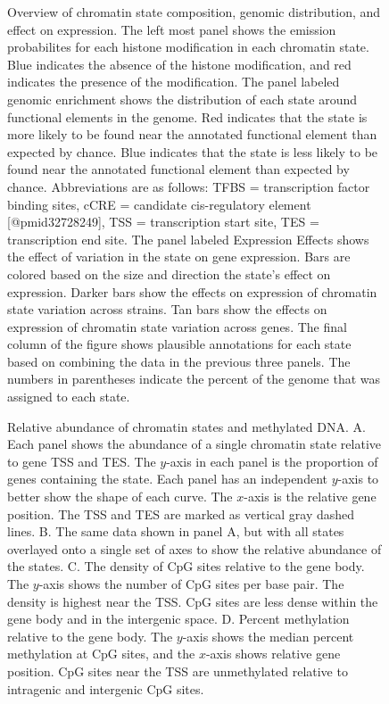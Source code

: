 \documentclass[10pt,letterpaper]{article}
\begin{document}
\begin{figure}[ht]
\centering
\caption{Overview of chromatin state composition, genomic distribution,
and effect on expression. The left most panel shows the emission
probabilites for each histone modification in each chromatin state. 
Blue indicates the absence of the histone modification, and red 
indicates the presence of the modification. The panel labeled
genomic enrichment shows the distribution of each state around 
functional elements in the genome. Red indicates that the
state is more likely to be found near the annotated functional 
element than expected by chance. Blue indicates that the state
is less likely to be found near the annotated functional element
than expected by chance. Abbreviations are as follows: TFBS = 
transcription factor binding sites, cCRE = candidate cis-regulatory
element [@pmid32728249], TSS = transcription start site, 
TES = transcription end site. The panel labeled Expression Effects 
shows the effect of variation in the state on gene expression. 
Bars are colored based on the size and direction the state's effect on
expression. Darker bars show the effects on expression of chromatin 
state variation across strains. Tan bars show the effects on expression
of chromatin state variation across genes. The final column of the figure 
shows plausible annotations for each state based on combining the data in 
the previous three panels. The numbers in parentheses indicate the percent 
of the genome that was assigned to each state.}
\label{fig:state_overview}
\end{figure}

\begin{figure}[ht]
\centering
\caption{Relative abundance of chromatin states and methylated DNA. A. Each panel shows
the abundance of a single chromatin state relative to gene TSS and TES. The 
$y$-axis in each panel is the proportion of genes containing the state. Each
panel has an independent $y$-axis to better show the shape of each curve.
The $x$-axis is the relative gene position. The TSS and TES are marked as vertical
gray dashed lines. B. The same data shown in panel A, but with all states overlayed
onto a single set of axes to show the relative abundance of the states. 
C. The density of CpG sites relative to the gene body. The $y$-axis shows the 
number of CpG sites per base pair. The density is highest near the TSS. 
CpG sites are less dense within the gene body and in the intergenic space. 
D. Percent methylation relative to the gene body. The $y$-axis shows the median 
percent methylation at CpG sites, and the $x$-axis shows relative gene position. 
CpG sites near the TSS are unmethylated relative to intragenic and intergenic
CpG sites.}
\label{fig:state_abundance}
\end{figure}
\end{document}
